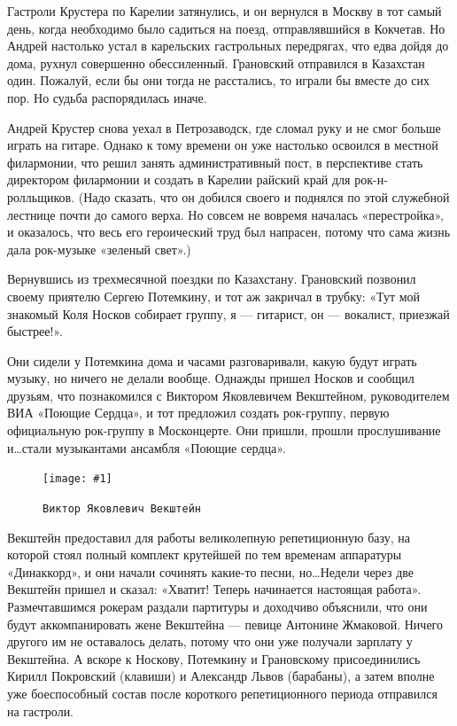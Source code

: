 \documentclass[10pt, twoside]{book}
\newcommand{\myincludegraphics}[1]{\texttt{[image: \#1]}}
\begin{document}
Гастроли Крустера по Карелии затянулись, и он вернулся в Москву в тот самый день, когда необходимо было садиться на
поезд, отправлявшийся в Кокчетав. Но Андрей настолько устал в карельских гастрольных передрягах, что едва дойдя до дома,
рухнул совершенно обессиленный. Грановский отправился в Казахстан один. Пожалуй, если бы они тогда не расстались, то
играли бы вместе до сих пор. Но судьба распорядилась иначе.

Андрей Крустер снова уехал в Петрозаводск, где сломал руку и не смог больше играть на гитаре. Однако к тому времени он
уже настолько освоился в местной филармонии, что решил занять административный пост, в перспективе стать директором
филармонии и создать в Карелии райский край для рок-н-ролльщиков. (Надо сказать, что он добился своего и поднялся по
этой служебной лестнице почти до самого верха. Но совсем не вовремя началась «перестройка», и оказалось, что весь его
героический труд был напрасен, потому что сама жизнь дала рок-музыке «зеленый свет».)

Вернувшись из трехмесячной поездки по Казахстану. Грановский позвонил своему приятелю Сергею Потемкину, и тот аж
закричал в трубку: «Тут мой знакомый Коля Носков собирает группу, я — гитарист, он — вокалист, приезжай быстрее!».

Они сидели у Потемкина дома и часами разговаривали, какую будут играть музыку, но ничего не делали вообще. Однажды
пришел Носков и сообщил друзьям, что познакомился с Виктором Яковлевичем Векштейном, руководителем ВИА «Поющие Сердца»,
и тот предложил создать рок-группу, первую официальную рок-группу в Москонцерте. Они пришли, прошли прослушивание
и\ldots стали музыкантами ансамбля «Поющие сердца».

\begin{figure}[h]
    \centering
    \myincludegraphics{Image10}
    \caption{\texttt{Виктор Яковлевич Векштейн}}
\end{figure}

Векштейн предоставил для работы великолепную репетиционную базу, на которой стоял полный комплект крутейшей по тем
временам аппаратуры «Динаккорд», и они начали сочинять какие-то песни, но\ldots Недели через две Векштейн пришел и
сказал: «Хватит! Теперь начинается настоящая работа». Размечтавшимся рокерам раздали партитуры и доходчиво объяснили,
что они будут аккомпанировать жене Векштейна — певице Антонине Жмаковой. Ничего другого им не оставалось делать, потому
что они уже получали зарплату у Векштейна. А вскоре к Носкову, Потемкину и Грановскому присоединились Кирилл Покровский
(клавиши) и Александр Львов (барабаны), а затем вполне уже боеспособный состав после короткого репетиционного периода
отправился на гастроли.
\end{document}
